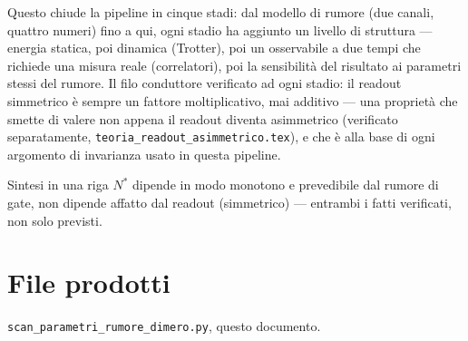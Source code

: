 \documentclass[11pt,a4paper]{article}
\begin{document}
Questo chiude la pipeline in cinque stadi: dal modello di rumore
(due canali, quattro numeri) fino a qui, ogni stadio ha aggiunto un
livello di struttura --- energia statica, poi dinamica (Trotter), poi un
osservabile a due tempi che richiede una misura reale (correlatori), poi
la sensibilità del risultato ai parametri stessi del rumore. Il filo
conduttore verificato ad ogni stadio: il readout simmetrico è sempre un
fattore moltiplicativo, mai additivo --- una proprietà che smette di
valere non appena il readout diventa asimmetrico (verificato
separatamente, \texttt{teoria\_readout\_asimmetrico.tex}), e che è alla
base di ogni argomento di invarianza usato in questa pipeline.

\begin{okbox}{Sintesi in una riga}
$N^*$ dipende in modo monotono e prevedibile dal rumore di gate, non
dipende affatto dal readout (simmetrico) --- entrambi i fatti verificati,
non solo previsti.
\end{okbox}

\section*{File prodotti}

\texttt{scan\_parametri\_rumore\_dimero.py}, questo documento.
\end{document}
